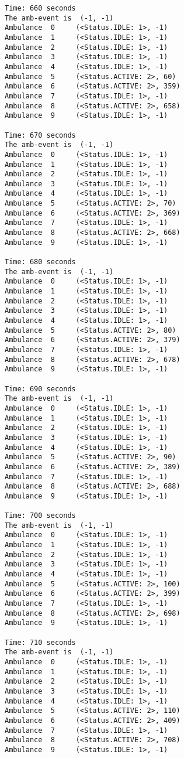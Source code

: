 \documentclass[11pt]{article}
\begin{document}
\begin{Verbatim}[commandchars=\\\{\}]
Time: 660 seconds
The amb-event is  (-1, -1)
Ambulance  0	 (<Status.IDLE: 1>, -1)
Ambulance  1	 (<Status.IDLE: 1>, -1)
Ambulance  2	 (<Status.IDLE: 1>, -1)
Ambulance  3	 (<Status.IDLE: 1>, -1)
Ambulance  4	 (<Status.IDLE: 1>, -1)
Ambulance  5	 (<Status.ACTIVE: 2>, 60)
Ambulance  6	 (<Status.ACTIVE: 2>, 359)
Ambulance  7	 (<Status.IDLE: 1>, -1)
Ambulance  8	 (<Status.ACTIVE: 2>, 658)
Ambulance  9	 (<Status.IDLE: 1>, -1)

Time: 670 seconds
The amb-event is  (-1, -1)
Ambulance  0	 (<Status.IDLE: 1>, -1)
Ambulance  1	 (<Status.IDLE: 1>, -1)
Ambulance  2	 (<Status.IDLE: 1>, -1)
Ambulance  3	 (<Status.IDLE: 1>, -1)
Ambulance  4	 (<Status.IDLE: 1>, -1)
Ambulance  5	 (<Status.ACTIVE: 2>, 70)
Ambulance  6	 (<Status.ACTIVE: 2>, 369)
Ambulance  7	 (<Status.IDLE: 1>, -1)
Ambulance  8	 (<Status.ACTIVE: 2>, 668)
Ambulance  9	 (<Status.IDLE: 1>, -1)

Time: 680 seconds
The amb-event is  (-1, -1)
Ambulance  0	 (<Status.IDLE: 1>, -1)
Ambulance  1	 (<Status.IDLE: 1>, -1)
Ambulance  2	 (<Status.IDLE: 1>, -1)
Ambulance  3	 (<Status.IDLE: 1>, -1)
Ambulance  4	 (<Status.IDLE: 1>, -1)
Ambulance  5	 (<Status.ACTIVE: 2>, 80)
Ambulance  6	 (<Status.ACTIVE: 2>, 379)
Ambulance  7	 (<Status.IDLE: 1>, -1)
Ambulance  8	 (<Status.ACTIVE: 2>, 678)
Ambulance  9	 (<Status.IDLE: 1>, -1)

Time: 690 seconds
The amb-event is  (-1, -1)
Ambulance  0	 (<Status.IDLE: 1>, -1)
Ambulance  1	 (<Status.IDLE: 1>, -1)
Ambulance  2	 (<Status.IDLE: 1>, -1)
Ambulance  3	 (<Status.IDLE: 1>, -1)
Ambulance  4	 (<Status.IDLE: 1>, -1)
Ambulance  5	 (<Status.ACTIVE: 2>, 90)
Ambulance  6	 (<Status.ACTIVE: 2>, 389)
Ambulance  7	 (<Status.IDLE: 1>, -1)
Ambulance  8	 (<Status.ACTIVE: 2>, 688)
Ambulance  9	 (<Status.IDLE: 1>, -1)

Time: 700 seconds
The amb-event is  (-1, -1)
Ambulance  0	 (<Status.IDLE: 1>, -1)
Ambulance  1	 (<Status.IDLE: 1>, -1)
Ambulance  2	 (<Status.IDLE: 1>, -1)
Ambulance  3	 (<Status.IDLE: 1>, -1)
Ambulance  4	 (<Status.IDLE: 1>, -1)
Ambulance  5	 (<Status.ACTIVE: 2>, 100)
Ambulance  6	 (<Status.ACTIVE: 2>, 399)
Ambulance  7	 (<Status.IDLE: 1>, -1)
Ambulance  8	 (<Status.ACTIVE: 2>, 698)
Ambulance  9	 (<Status.IDLE: 1>, -1)

Time: 710 seconds
The amb-event is  (-1, -1)
Ambulance  0	 (<Status.IDLE: 1>, -1)
Ambulance  1	 (<Status.IDLE: 1>, -1)
Ambulance  2	 (<Status.IDLE: 1>, -1)
Ambulance  3	 (<Status.IDLE: 1>, -1)
Ambulance  4	 (<Status.IDLE: 1>, -1)
Ambulance  5	 (<Status.ACTIVE: 2>, 110)
Ambulance  6	 (<Status.ACTIVE: 2>, 409)
Ambulance  7	 (<Status.IDLE: 1>, -1)
Ambulance  8	 (<Status.ACTIVE: 2>, 708)
Ambulance  9	 (<Status.IDLE: 1>, -1)


\end{Verbatim}
\end{document}
